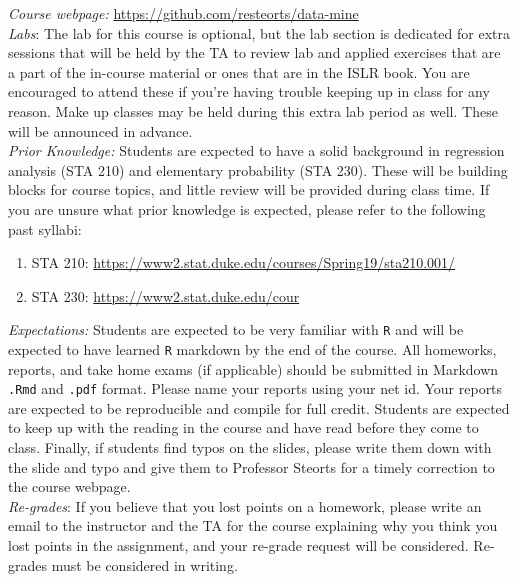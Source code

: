 \documentclass[11pt]{article}
\begin{document}
\emph{Course webpage:} \url{https://github.com/resteorts/data-mine} \\

\emph{Labs}: The lab for this course is optional, but the lab section is dedicated for extra sessions that will be held by the TA to review lab and applied exercises that are a part of the in-course material or ones that are in the ISLR book. You are encouraged to attend these if you're having trouble keeping up in class for any reason. Make up classes may be held during this extra lab period as well. These will be announced in advance. \\

\emph{Prior Knowledge:} Students are expected to have a solid background in regression analysis (STA
210) and elementary probability (STA 230). These will be building blocks for course topics, and
little review will be provided during class time. If you are unsure what prior knowledge is expected,
please refer to the following past syllabi:

\begin{enumerate}
\item STA 210: \url{https://www2.stat.duke.edu/courses/Spring19/sta210.001/}
\item STA 230: \url{https://www2.stat.duke.edu/cour}
\end{enumerate}


\emph{Expectations:} Students are expected to be very familiar with \texttt{R} and will be expected to have learned \texttt{R} markdown by the end of the course. All homeworks, reports, and take home exams (if applicable) should be submitted in Markdown \texttt{.Rmd} and \texttt{.pdf} format. Please name your reports using your net id. Your reports are expected to be reproducible and compile for full credit.  Students are expected to keep up with the reading in the course and have read before they come to class. Finally, if students find typos on the slides, please write them down with the slide and typo and give them to Professor Steorts for a timely correction to the course webpage.  \\

\emph{Re-grades}: If you believe that you lost points on a homework, please write an email to the instructor and the TA for the course explaining why you think you lost points in the assignment, and your re-grade request will be considered. Re-grades must be considered in writing. \\
\end{document}
